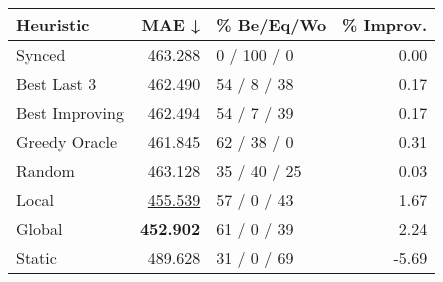 \begin{tabular}{lrlr}
\toprule
\textbf{Heuristic} & \textbf{MAE ↓} & \textbf{\% Be/Eq/Wo} & \textbf{\% Improv.} \\
\midrule
            Synced &        463.288 &          0 / 100 / 0 &                0.00 \\
\midrule
       Best Last 3 &        462.490 &          54 / 8 / 38 &                0.17 \\
    Best Improving &        462.494 &          54 / 7 / 39 &                0.17 \\
\addlinespace
     Greedy Oracle &        461.845 &          62 / 38 / 0 &                0.31 \\
            Random &        463.128 &         35 / 40 / 25 &                0.03 \\
\midrule
             Local &        \underline{455.539} &          57 / 0 / 43 &                1.67 \\
            Global &        \textbf{452.902} &          61 / 0 / 39 &                2.24 \\
\midrule
            Static &        489.628 &          31 / 0 / 69 &               -5.69 \\
\bottomrule
\end{tabular}

\label{tab:non_lr01_le1_bs2_Summary}
